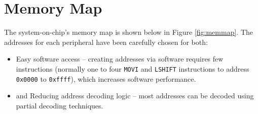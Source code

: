 \section{Memory Map}
The system-on-chip's memory map is shown below in Figure \ref{fig:memmap}. The addresses for each peripheral have been carefully chosen for both:
\begin{itemize}
\item Easy software access -- creating addresses via software requires few instructions (normally one to four \verb|MOVI| and \verb|LSHIFT| instructions to address \verb|0x0000| to  \verb|0xffff|), which increases software performance.
\item and Reducing address decoding logic -- most addresses can be decoded using partial decoding techniques.
\end{itemize}


